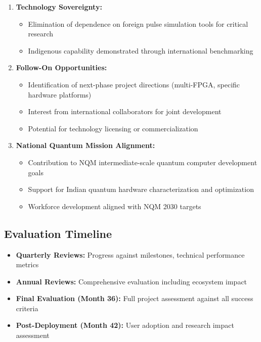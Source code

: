 \documentclass[12pt,a4paper]{article}
\begin{document}
\begin{enumerate}[noitemsep]
\item \textbf{Technology Sovereignty:}
   \begin{itemize}[noitemsep]
   \item Elimination of dependence on foreign pulse simulation tools for critical research
   \item Indigenous capability demonstrated through international benchmarking
   \end{itemize}

\item \textbf{Follow-On Opportunities:}
   \begin{itemize}[noitemsep]
   \item Identification of next-phase project directions (multi-FPGA, specific hardware platforms)
   \item Interest from international collaborators for joint development
   \item Potential for technology licensing or commercialization
   \end{itemize}

\item \textbf{National Quantum Mission Alignment:}
   \begin{itemize}[noitemsep]
   \item Contribution to NQM intermediate-scale quantum computer development goals
   \item Support for Indian quantum hardware characterization and optimization
   \item Workforce development aligned with NQM 2030 targets
   \end{itemize}
\end{enumerate}

\subsection{Evaluation Timeline}

\begin{itemize}[noitemsep]
\item \textbf{Quarterly Reviews:} Progress against milestones, technical performance metrics
\item \textbf{Annual Reviews:} Comprehensive evaluation including ecosystem impact
\item \textbf{Final Evaluation (Month 36):} Full project assessment against all success criteria
\item \textbf{Post-Deployment (Month 42):} User adoption and research impact assessment
\end{itemize}
\end{document}
